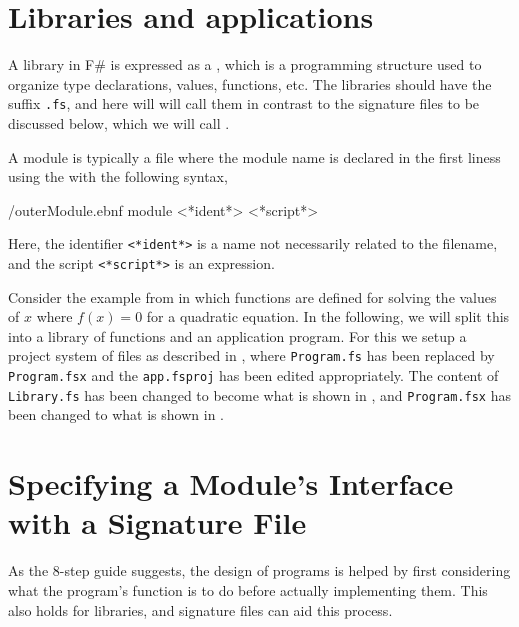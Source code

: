 \documentclass[fsharpNotes.tex]{subfiles}
\begin{document}
\section{Libraries and applications}
\label{sec:modules}
A library in F\# is expressed as a , which is a programming structure used to organize type declarations, values, functions, etc. The libraries should have the  suffix \lstinline[language=console]{.fs}, and here will will call them  in contrast to the signature files to be discussed below, which we will call .

A module is typically a file where the module name is declared in the first liness using the  with the following syntax,
%
\begin{verbatimwrite}{\ebnf/outerModule.ebnf}
module <*ident*>
<*script*>
\end{verbatimwrite}
%
Here, the identifier \lstinline[language=syntax]{<*ident*>} is a name not necessarily related to the filename, and the script \lstinline[language=syntax]{<*script*>} is an expression.

Consider the example from  in which functions are defined for solving the values of $x$ where $f(x)=0$ for a quadratic equation. In the following, we will split this into a library of functions and an application program. For this we setup a project system of files as described in , where \lstinline[language=console]{Program.fs} has been replaced by \lstinline[language=console]{Program.fsx} and the \lstinline[language=console]{app.fsproj} has been edited appropriately. The content of  \lstinline[language=console]{Library.fs} has been changed to become what is shown in , 
and \lstinline[language=console]{Program.fsx} has been changed to what is shown in .

\section{Specifying a Module's Interface with a Signature File}
As the 8-step guide suggests, the design of programs is helped by first considering what the program's function is to do before actually implementing them. This also holds for libraries, and signature files can aid this process. 
\end{document}
